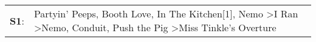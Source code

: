 \begin{supertabular}{p{0.03\textwidth}p{0.92\textwidth}}
 \textbf{S1}:  &  Partyin' Peeps\textsuperscript{}, \enspace Booth Love\textsuperscript{}, \enspace In The Kitchen[1]\textsuperscript{}, \enspace Nemo\textsuperscript{} \textgreater \enspace I Ran\textsuperscript{} \textgreater \enspace Nemo\textsuperscript{}, \enspace Conduit\textsuperscript{}, \enspace Push the Pig\textsuperscript{} \textgreater \enspace Miss Tinkle's Overture\textsuperscript{}  \enspace  \\
\end{supertabular}
